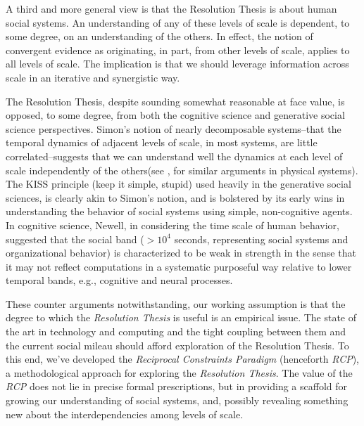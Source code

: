 \documentclass{article}
\begin{document}
A third and more general view is that the Resolution Thesis is about human social systems.  An understanding of any of these levels of scale is dependent, to some degree, on an understanding of the others.  In effect, the notion of convergent evidence as originating, in part, from other levels of scale, applies to all levels of scale.  The implication is that we should leverage information across scale in an iterative and synergistic way. 

The Resolution Thesis, despite sounding somewhat reasonable at face value, is opposed, to some degree, from both the cognitive science and generative social science perspectives.  Simon's notion of nearly decomposable systems--that the temporal dynamics of adjacent levels of scale, in most systems, are little correlated--suggests that we can understand well the dynamics at each level of scale independently of the others\cite{simon1962}(see \cite{anderson1972}, for similar arguments in physical systems).  The KISS principle (keep it simple, stupid) used heavily in the generative social sciences, is clearly akin to Simon's notion, and is bolstered by its early wins in understanding the behavior of social systems using simple, non-cognitive agents\cite{schelling1969,axelrod1995,epstein2002}.  In cognitive science, Newell, in considering the time scale of human behavior, suggested that the social band ($> 10^4$ seconds, representing social systems and organizational behavior) is characterized to be weak in strength in the sense that it may not reflect computations in a systematic purposeful way relative to lower temporal bands, e.g., cognitive and neural processes\cite{newell1990}.  

These counter arguments notwithstanding, our working assumption is that the degree to which the  \textit{Resolution Thesis} is useful is an empirical issue.  The state of the art in technology and computing and the tight coupling between them and the current social mileau should afford exploration of the Resolution Thesis.   To this end, we've developed the \textit{Reciprocal Constraints Paradigm} (henceforth \textit{RCP}), a methodological approach for exploring the  \textit{Resolution Thesis}. The value of the \textit{RCP} does not lie in precise formal prescriptions, but in providing a scaffold for growing our understanding of social systems, and, possibly revealing something new about the interdependencies among levels of scale.  
\end{document}

